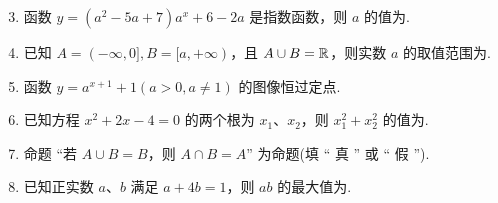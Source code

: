 \documentclass[a4paper,11pt]{article}
\begin{document}


\begin{enumerate}
\setcounter{enumi}{2}

\item 函数 $y=(a^2-5a+7)a^x+6-2a$ 是指数函数，则 $a$ 的值为\blankline[4.4em].

\ifanswer
\solbegin
{}
\solend
\fi

\item 已知 $A=(-\infty,0],B=[a,+\infty)$，且 $A\cup B=\mathbb{R}$，则实数 $a$ 的取值范围为\blankline[4.4em].

\ifanswer
{}
\fi

\item 函数 $y=a^{x+1}+1(a>0,a\ne1)$ 的图像恒过定点\blankline[4.4em].

\ifanswer
{}
\fi

\item 已知方程 $x^2+2x-4=0$ 的两个根为 $x_1$、$x_2$，则 $x_1^2+x_2^2$ 的值为\blankline[4.4em].

\ifanswer
\solbegin
{}
\solend
\fi

\item 命题 “若 $A\cup B=B$，则 $A\cap B=A$” 为\blankline[4.4em]命题(填 “ 真 ” 或 “ 假 ”).

\ifanswer
{}
\fi

\item 已知正实数 $a$、$b$ 满足 $a+4b=1$，则 $ab$ 的最大值为\blankline[4.4em].

\ifanswer
\solbegin
{}
\solend
\fi


\end{enumerate}
\end{document}
